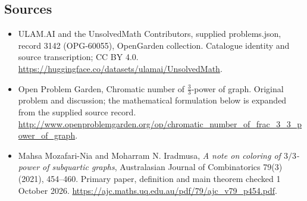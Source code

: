 \documentclass[11pt,a4paper]{article}
\begin{document}
\subsection{Sources}
\begin{itemize}
\item[S1] ULAM.AI and the UnsolvedMath Contributors, supplied problems.json, record 3142 (OPG-60055), OpenGarden collection. Catalogue identity and source transcription; CC BY 4.0.
\url{https://huggingface.co/datasets/ulamai/UnsolvedMath}.
\item[S2] Open Problem Garden, Chromatic number of $\frac{3}{3}$-power of graph. Original problem and discussion; the mathematical formulation below is expanded from the supplied source record.
\url{http://www.openproblemgarden.org/op/chromatic_number_of_frac_3_3_power_of_graph}.

\item[R1] Mahsa Mozafari-Nia and Moharram N. Iradmusa,
\emph{A note on coloring of $3/3$-power of subquartic graphs},
Australasian Journal of Combinatorics 79(3) (2021), 454--460.
Primary paper, definition and main theorem checked 1 October 2026.
\url{https://ajc.maths.uq.edu.au/pdf/79/ajc_v79_p454.pdf}.

\end{itemize}
\end{document}
